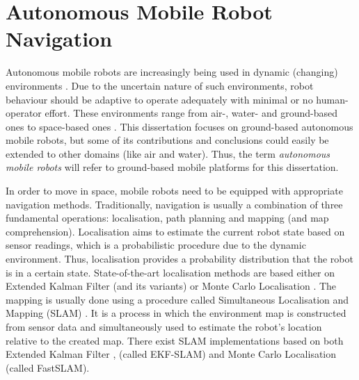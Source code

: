     
\section{Autonomous Mobile Robot Navigation}

Autonomous mobile robots are increasingly being used in dynamic (changing) environments \cite{Kunze2018,Guiochet2017,Ramachandram2017,BoninFont2008,Jarvis2008}. Due to the uncertain nature of such environments, robot behaviour should be adaptive to operate adequately with minimal or no human-operator effort. These environments range from air-, water- and ground-based ones to space-based ones \cite{Kunze2018,BoninFont2008}. This dissertation focuses on ground-based autonomous mobile robots, but some of its contributions and conclusions could easily be extended to other domains (like air and water). Thus, the term \emph{autonomous mobile robots} will refer to ground-based mobile platforms for this dissertation.

In order to move in space, mobile robots need to be equipped with appropriate navigation methods. Traditionally, navigation is usually a combination of three fundamental operations: localisation, path planning and mapping (and map comprehension). Localisation aims to estimate the current robot state based on sensor readings, which is a probabilistic procedure due to the dynamic environment. Thus, localisation provides a probability distribution that the robot is in a certain state. State-of-the-art localisation methods are based either on Extended Kalman Filter \cite{Jetto1999,Moore2015} (and its variants) or Monte Carlo Localisation \cite{Dellaert1999,Thrun2006}. The mapping is usually done using a procedure called Simultaneous Localisation and Mapping (SLAM) \cite{Leonard1991,DurrantWhyte2006}. It is a process in which the environment map is constructed from sensor data and simultaneously used to estimate the robot's location relative to the created map. There exist SLAM implementations based on both Extended Kalman Filter \cite{Dissanayake2001,Leonard2000,Guivant2001}, (called EKF-SLAM) and Monte Carlo Localisation \cite{Montemerlo2002,Montemerlo2003} (called FastSLAM).

